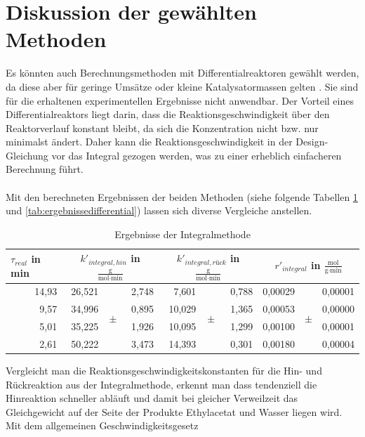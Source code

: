 \documentclass[12pt,liststotoc]{report}
\begin{document}
\section{Diskussion der gewählten Methoden}

Es könnten auch Berechnungsmethoden mit Differentialreaktoren gewählt werden, da diese aber für geringe Umsätze oder kleine Katalysatormassen gelten \cite{Skript_2018, Levenspiel}. Sie sind  für die erhaltenen experimentellen Ergebnisse nicht anwendbar. Der Vorteil eines Differentialreaktors liegt darin, dass die Reaktionsgeschwindigkeit über den Reaktorverlauf konstant bleibt, da sich die Konzentration nicht bzw. nur minimalst ändert. Daher kann die Reaktionsgeschwindigkeit in der Design-Gleichung vor das Integral gezogen werden, was zu einer erheblich einfacheren Berechnung führt.
\\
\\
Mit den berechneten Ergebnissen der beiden Methoden (siehe folgende Tabellen \ref{tab:ergebnisseintegral} und \ref{tab:ergebnissedifferential}) lassen sich diverse Vergleiche anstellen.

\begin{table}[htbp]
  \centering
  \caption{Ergebnisse der Integralmethode}
    \begin{tabular}{r|rcr|rcr|rcr}
    \toprule
    \multicolumn{1}{l|}{$\tau_{real}$ in min}& \multicolumn{3}{c|}{$k'_{integral, hin}$ in $\frac{\text{g}}{\text{mol}\cdot\text{min}}$}  & \multicolumn{3}{c|}{$k'_{integral,rück}$ in $\frac{\text{g}}{\text{mol}\cdot\text{min}}$}  & \multicolumn{3}{c}{$r'_{integral}$ in $\frac{\text{mol}}{\text{g}\cdot\text{min}}$} \\
    \midrule
    14,93 & 26,521 & \multirow{4}[1]{*}{$\pm$} & 2,748 & 7,601 & \multirow{4}[1]{*}{$\pm$} & 0,788 & 0,00029 & \multirow{4}[1]{*}{$\pm$} & 0,00001 \\
    9,57  & 34,996 &       & 0,895 & 10,029 &       & 1,365 & 0,00053 &       & 0,00000 \\
    5,01  & 35,225 &       & 1,926 & 10,095 &       & 1,299 & 0,00100 &       & 0,00001 \\
    2,61  & 50,222 &       & 3,473 & 14,393 &       & 0,301 & 0,00180 &       & 0,00004\\
    \bottomrule
    \end{tabular}%
  \label{tab:ergebnisseintegral}%
\end{table}%
\noindent
Vergleicht man die Reaktionsgeschwindigkeitskonstanten für die Hin- und Rückreaktion aus der Integralmethode, erkennt man dass tendenziell die Hinreaktion schneller abläuft und damit bei gleicher Verweilzeit das Gleichgewicht auf der Seite der Produkte Ethylacetat und Wasser liegen wird. Mit dem allgemeinen Geschwindigkeitsgesetz 
\end{document}
